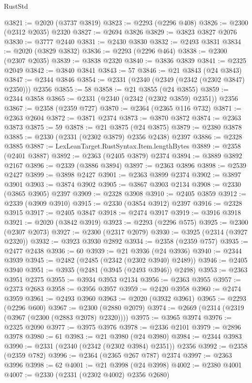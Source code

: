 \begin{lexlean}{RustStd}
\begin{coremodule}
@3821 := @2020 (@3737 @3819)
@3823 := @2293 (@2296 @408)
@3826 := @2300 (@2312 @2035) @2320
@3827 := @2694 @3826
@3829 := @3823 @3827 @2076
@3830 := @3777 @2440
@3831 := @2430 @3830
@3832 := @2493 @3831
@3834 := @2020 (@3829 @3832)
@3836 := @2293 (@2296 @464)
@3838 := @2300 (@2307 @2035)
@3839 := @3838 @2320
@3840 := @3836 @3839
@3841 := @2325 @2049
@3842 := @3840 @3841
@3843 := 57
@3846 := @21 @3843 (@24 @3843)
@3847 := @2344 @3846
@3854 := @2331 (@2340 (@2349 (@2342 (@2302 @3847) @2350))) @2356
@3855 := 58
@3858 := @21 @3855 (@24 @3855)
@3859 := @2344 @3858
@3865 := @2331 (@2340 (@2342 (@2302 @3859) @2351)) @2356
@3867 := @2358 (@2359 @727)
@3870 := @2364 (@2365 @116 @732)
@3871 := @2363 @2604
@3872 := @3871 @2374
@3873 := @3870 @3872
@3874 := @2363 @3873
@3875 := 59
@3878 := @21 @3875 (@24 @3875)
@3879 := @2380 @3878
@3885 := @2330 (@2331 (@2302 @3879) @2356 @2438) @2397
@3886 := @2328 @3885
@3887 := LexLeanTarget.RustSyntax.Item.lengthBytes
@3889 := @2358 (@2401 @3887)
@3892 := @2363 (@2405 @3879) @2374
@3894 := @3889 @3892 @2167
@3896 := @2339 (@3886 @3894)
@3897 := @2363 @3896
@3898 := @2539 @2427
@3899 := @3898 @2427
@3901 := @2363 @3899 @2374
@3902 := @3897 @3901
@3903 := @3874 @3902
@3905 := @3867 @3903 @2134
@3908 := @2330 (@3865 @3905) @2397
@3909 := @2328 @3908
@3910 := @2405 @3859
@3912 := @2339 (@3909 @3910)
@3915 := @2330 (@3854 @3912) @2397
@3916 := @2328 @3915
@3917 := @2405 @3847
@3918 := @2474 @3917
@3919 := @3916 @3918
@3921 := @2020 (@3842 @3919)
@3923 := @2293 (@2296 @575)
@3925 := @2300 (@2307 @2073)
@3927 := @2300 (@2317 @2079)
@3930 := @3925 (@2314 (@3927 @2320))
@3932 := @3923 @3930 @2892
@3934 := @2358 (@2359 @757)
@3935 := @2477 @2438
@3936 := 60
@3939 := @21 @3936 (@24 @3936)
@3940 := @2344 @3939
@3945 := @2482 (@2485 (@2342 (@2302 @3940) @2489))
@3946 := @2405 @3940
@3951 := @3935 (@2481 (@3945 (@2493 @3946)) @2498)
@3953 := @2363 @3951 @2375
@3955 := @3934 @3953 @2134
@3956 := @2363 @3955
@3957 := @2373 @2683
@3958 := @3956 @3957
@3959 := @2420 @3958
@3960 := @2474 @3959
@3961 := @2493 @3960
@3963 := @2020 (@3932 @3961)
@3965 := @2293 (@2296 @600)
@3967 := @2300 (@2880 @2079)
@3974 := @2669 (@2314 (@2319 (@3967 (@2300 (@2883 @2078) @2320))))
@3975 := @3965 @3974
@3976 := @2325 @2090
@3977 := @3975 @3976
@3978 := @2336 @2101
@3979 := @2896 @3978
@3980 := 61
@3983 := @21 @3980 (@24 @3980)
@3984 := @2344 @3983
@3990 := @2331 (@2340 (@2342 (@2302 @3984) @2351)) @2356
@3992 := @2358 (@2359 @782)
@3996 := @2364 (@2365 @267 @787) @2374
@3997 := @2363 @3996
@3998 := 62
@4001 := @21 @3998 (@24 @3998)
@4002 := @2380 @4001
@4007 := @2330 (@2331 (@2302 @4002) @2356 @2680)

\end{coremodule}
\end{lexlean}
